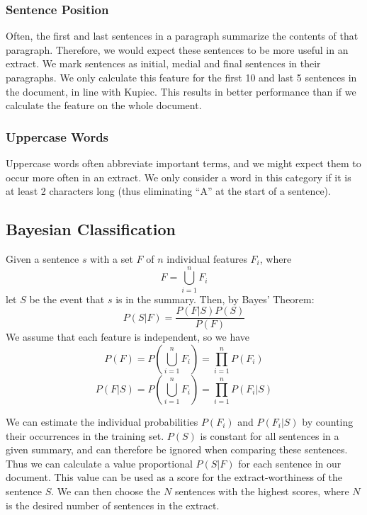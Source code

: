 \documentclass[a4paper, 10pt]{article}
\begin{document}
\subsubsection{Sentence Position}
Often, the first and last sentences in a paragraph summarize the contents of that paragraph. Therefore, we would expect these sentences to be more useful in an extract. We mark sentences as initial, medial and final sentences in their paragraphs. We only calculate this feature for the first 10 and last 5 sentences in the document, in line with Kupiec. This results in better performance than if we calculate the feature on the whole document.

\subsubsection{Uppercase Words}
Uppercase words often abbreviate important terms, and we might expect them to occur more often in an extract. We only consider a word in this category if it is at least 2 characters long (thus eliminating ``A'' at the start of a sentence).

\subsection{Bayesian Classification}
Given a sentence $s$ with a set $F$ of $n$ individual features $F_i$, where
\begin{equation} F = \bigcup_{i=1}^n F_i \end{equation}
let $S$ be the event that $s$ is in the summary. Then, by Bayes' Theorem:
\begin{equation} P(S|F) = \frac{P(F|S)P(S)}{P(F)} \end{equation}
We assume that each feature is independent, so we have
\begin{equation} P(F) = P \left( \bigcup_{i=1}^n F_i \right) = \prod_{i=1}^n P(F_i) \end{equation}
\begin{equation} P(F|S) = P \left( \bigcup_{i=1}^n F_i \right) = \prod_{i=1}^n P(F_i|S) \end{equation}

We can estimate the individual probabilities $P(F_i)$ and $P(F_i|S)$ by counting their occurrences in the training set. $P(S)$ is constant for all sentences in a given summary, and can therefore be ignored when comparing these sentences. Thus we can calculate a value proportional $P(S|F)$ for each sentence in our document. This value can be used as a score for the extract-worthiness of the sentence $S$. We can then choose the $N$ sentences with the highest scores, where $N$ is the desired number of sentences in the extract.
\end{document}
